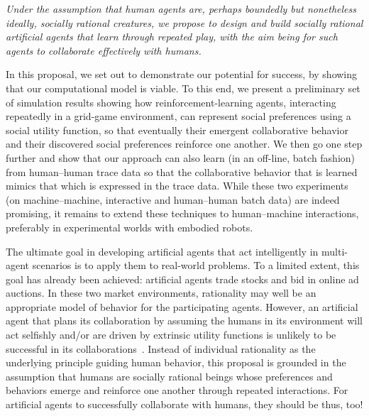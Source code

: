 \emph{Under the assumption that human agents are, perhaps boundedly
  but nonetheless ideally, socially rational creatures, we propose to
  design and build socially rational artificial agents that learn
  through repeated play, with the aim being for such agents to
  collaborate effectively with humans.}

In this proposal, we set out to demonstrate our potential for success,
by showing that our computational model is viable.  To this end,
we present a preliminary set of simulation results showing how
reinforcement-learning agents, interacting repeatedly in a grid-game
environment, can represent social preferences using a social utility
function, so that eventually their emergent collaborative behavior and
their discovered social preferences reinforce one another.  We then go
one step further and show that our approach can also learn (in an
off-line, batch fashion) from human--human trace data so that the
collaborative behavior that is learned mimics that which is expressed
in the trace data.  While these two experiments (on machine--machine,
interactive and human--human batch data) are indeed promising, it
remains to extend these techniques to human--machine interactions,
preferably in experimental worlds with embodied robots.

The ultimate goal in developing artificial agents that act
intelligently in multi-agent scenarios is to apply them to real-world
problems.  To a limited extent, this goal has already been achieved:
artificial agents trade stocks and bid in online ad auctions.  In
these two market environments, rationality may well be an appropriate
model of behavior for the participating agents.  However,
an artificial agent that plans its collaboration by assuming the
humans in its environment will act selfishly and/or are driven by
extrinsic utility functions is unlikely to be successful in its
collaborations~\cite{Camerer:2003,kahnemanst82}.  Instead of
individual rationality as the underlying principle guiding human
behavior, this proposal is grounded in the assumption that humans are
socially rational beings whose preferences and behaviors emerge and
reinforce one another through repeated interactions.  For artificial
agents to successfully collaborate with humans, they should be thus,
too!

